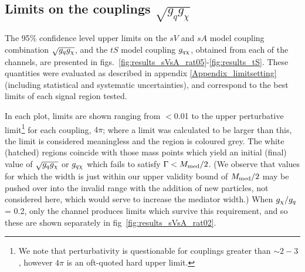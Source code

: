 \subsection{Limits on the couplings $\sqrt{g_{q}g_{\chi}}$}
The 95\% confidence level upper limits on the $sV$ and $sA$ model coupling combination $\sqrt{g_q g_{\chi}}$, and the $tS$ model coupling $g_{q \chi}$, obtained from each of the \monoX channels, are presented in figs.~\ref{fig:results_sVsA_rat05}-\ref{fig:results_tS}. These quantities were evaluated as described in appendix \ref{Appendix_limitsetting} (including statistical and systematic uncertainties), and correspond to the best limits of each signal region tested.

In each plot, limits are shown ranging from $<$0.01 to the upper perturbative limit\footnote{We note that perturbativity is questionable for couplings greater than $\sim 2-3$, however $4\pi$ is an oft-quoted hard upper limit.} for each coupling, $4\pi$; where a limit was calculated to be larger than this, the limit is considered meaningless and the region is coloured grey. The white (hatched) regions coincide with those mass points which yield an initial (final) value of $\sqrt{g_q g_{\chi}}$ or $g_{q \chi}$ which fails to satisfy $\Gamma < M_{\mathrm{med}} / 2$. (We observe that values for which the width is just within our upper validity bound of $M_{\mathrm{med}}/2$ may be pushed over into the invalid range with the addition of new particles, not considered here, which would serve to increase the mediator width.) When $g_{\chi} / g_q$ = 0.2, only the \monojet channel produces limits which survive this requirement, and so these are shown separately in fig~\ref{fig:results_sVsA_rat02}.


